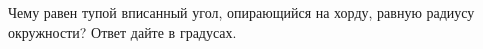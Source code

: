 \begin{ex}
	\begin{condition}
		Чему равен тупой вписанный угол, опирающийся на хорду, равную радиусу окружности? Ответ дайте в градусах.
	\end{condition}
\end{ex}